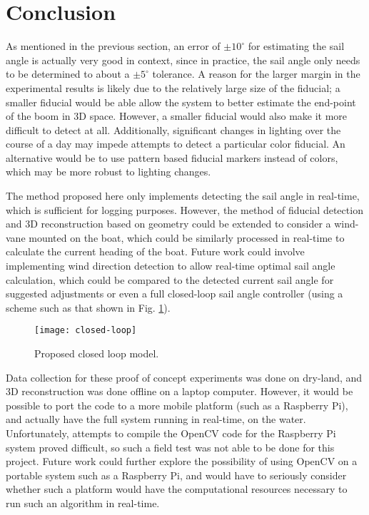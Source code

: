 \documentclass[letterpaper, 10 pt, conference]{ieeeconf}  %
\begin{document}
\section{Conclusion}
As mentioned in the previous section, an error of $\pm 10^\circ$ for estimating the sail angle is actually very good in context, since in practice, the sail angle only needs to be determined to about a $\pm 5^\circ$ tolerance. A reason for the larger margin in the experimental results is likely due to the relatively large size of the fiducial; a smaller fiducial would be able allow the system to better estimate the end-point of the boom in 3D space. However, a smaller fiducial would also make it more difficult to detect at all. Additionally, significant changes in lighting over the course of a day may impede attempts to detect a particular color fiducial. An alternative would be to use pattern based fiducial markers instead of colors, which may be more robust to lighting changes. 

The method proposed here only implements detecting the sail angle in real-time, which is sufficient for logging purposes. However, the method of fiducial detection and 3D reconstruction based on geometry could be extended to consider a wind-vane mounted on the boat, which could be similarly processed in real-time to calculate the current heading of the boat. Future work could involve implementing wind direction detection to allow real-time optimal sail angle calculation, which could be compared to the detected current sail angle for suggested adjustments or even a full closed-loop sail angle controller (using a scheme such as that shown in Fig. \ref{fig:closed}). 

\begin{figure}[htbp]
  \centering
   \texttt{[image: closed-loop]} 
  \caption{Proposed closed loop model. }
   \label{fig:closed}
\end{figure}

Data collection for these proof of concept experiments was done on dry-land, and 3D reconstruction was done offline on a laptop computer. However, it would be possible to port the code to a more mobile platform (such as a Raspberry Pi), and actually have the full system running in real-time, on the water. Unfortunately, attempts to compile the OpenCV code for the Raspberry Pi system proved difficult, so such a field test was not able to be done for this project. Future work could further explore the possibility of using OpenCV on a portable system such as a Raspberry Pi, and would have to seriously consider whether such a platform would have the computational resources necessary to run such an algorithm in real-time. 
\end{document}
